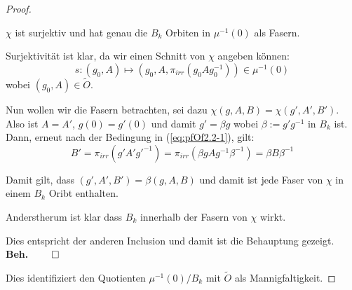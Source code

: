 \begin{proof}
\begin{comment}
  & \text{\color{red}so ist das falsch?!?}
\\&=g(0)g(0)^{-1}+g(0)(g_i)^{-1}\xi^1+\dots+g(0)(g_k)^{-1}\xi^k
\\&=1+g(0)(g_i)^{-1}\xi^1+\dots+g(0)(g_k)^{-1}\xi^k \in B_k
\end{align*}
bzw.
\[
(g(0))^{-1} \overset{\text{\color{red}?}}= g^{-1}(0)
\]
\end{comment}
\begin{beh}
$\chi$ ist surjektiv und hat genau die $B_k$ Orbiten in $\mu^{-1}(0)$ als
Fasern.
\end{beh}
Surjektivität ist klar, da wir einen Schnitt von $\chi$ angeben können:
\[
s:(g_0,A)\mapsto (g_0,A,\pi_{irr}(g_0Ag_0^{-1}))\in\mu^{-1}(0)
\]
wobei $(g_0,A)\in\tilde O$.
\begin{comment}
\[
\chi\circ s=\Big((g_0,A)\overset s\mapsto(g_0,A,\pi_{irr}(g_0Ag_0^{-1}))
  \overset\chi\mapsto(\underset{=g_0}{\underbrace{g_0(0)}},A)\Big)
  =\id_{\mu^{-1}(0)}
\]
\end{comment}
Nun wollen wir die Fasern betrachten, sei dazu $\chi(g,A,B)=\chi(g',A',B')$.
Also ist $A=A'$, $g(0)=g'(0)$ und damit $g'=\beta g$ wobei $\beta:=g'g^{-1}$ in
$B_k$ ist.
Dann, erneut nach der Bedingung in (\ref{eq:pfOf2.2-1}), gilt:
\[
B'=\pi_{irr}(g'A'g'^{-1})=\pi_{irr}(\beta gAg^{-1}\beta^{-1})=\beta B\beta^{-1}
\]
\begin{comment}
\begin{align*}
B'&\overset{(\ref{eq:pfOf2.2-1})}=
  \pi_{irr}(g'A'g'^{-1})  \overset{A'=A}{=}
    \pi_{irr}\left(g'\left(g^{-1}g\right)A\left(g^{-1}g\right)g'^{-1}\right)
    =\pi_{irr}(\beta gAg^{-1}\beta^{-1})
\\& =\beta \pi_{irr}(gAg^{-1}) \beta^{-1}
    \overset{(\ref{eq:pfOf2.2-1})}=\beta B\beta^{-1}
\end{align*}
\end{comment}
Damit gilt, dass $(g',A',B')=\beta(g,A,B)$ und damit ist jede Faser von $\chi$
in einem $B_k$ Oribt enthalten.
\begin{comment}
Also(?):
\begin{align*}
\beta(g,A,B) 
  &\overset{!}=(\beta g,A,\beta B\beta^{-1})
\\&=(g',A',B')
\end{align*}
\end{comment}
Anderstherum ist klar dass $B_k$ innerhalb der Fasern von $\chi$ wirkt.
\begin{comment}
Wie sieht die $B_k$-Wirkung auf $\mu^{-1}(0)$ aus?
Sei $\beta\in B_k$ und $(g,A,B)\in\mu^{-1}(0)$ so...
\end{comment}
Dies entspricht der anderen Inclusion und damit ist die Behauptung gezeigt.
{\hfill \textbf{Beh.} \ensuremath{\qed}}

Dies identifiziert den Quotienten $\mu^{-1}(0)/B_k$ mit $\tilde O$ als
Mannigfaltigkeit.

\TODO
\end{proof}

